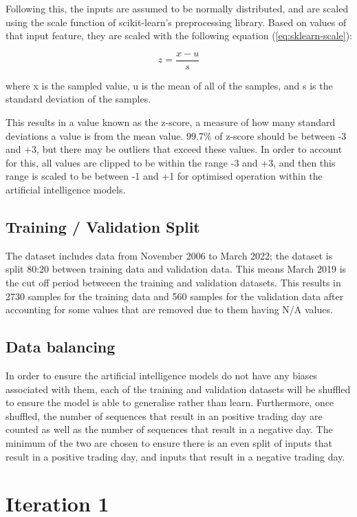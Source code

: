 Following this, the inputs are assumed to be normally distributed, and are scaled using the scale function of
scikit-learn's preprocessing library. Based on values of that input feature, they are scaled with the following
equation (\autoref{eq:sklearn-scale}):

\begin{equation}
    z = \frac{x - u}{s}
    \label{eq:sklearn-scale}
\end{equation}

where x is the sampled value, u is the mean of all of the samples, and s is the standard deviation of the samples.

This results in a value known as the z-score, a measure of how many standard deviations a value is from the mean value.
99.7\% of z-score should be between -3 and +3, but there may be outliers that exceed these values. In order to account for this,
all values are clipped to be within the range -3 and +3, and then this range is scaled to be between -1 and +1 for optimised
operation within the artificial intelligence models.

\subsection{Training / Validation Split}
The dataset includes data from November 2006 to March 2022; the dataset is split 80:20 between training data and
validation data. This means March 2019 is the cut off period betweeen the training and validation datasets. This
results in 2730 samples for the training data and 560 samples for the validation data after accounting for some
values that are removed due to them having N/A values.

\subsection{Data balancing}
In order to ensure the artificial intelligence models do not have any biases associated with them, each of the training
and validation datasets will be shuffled to ensure the model is able to generalise rather than learn. Furthermore, once
shuffled, the number of sequences that result in an positive trading day are counted as well as the number of sequences that result in
a negative day. The minimum of the two are chosen to ensure there is an even split of inputs that result in a positive trading day,
and inputs that result in a negative trading day.

\section{Iteration 1}
